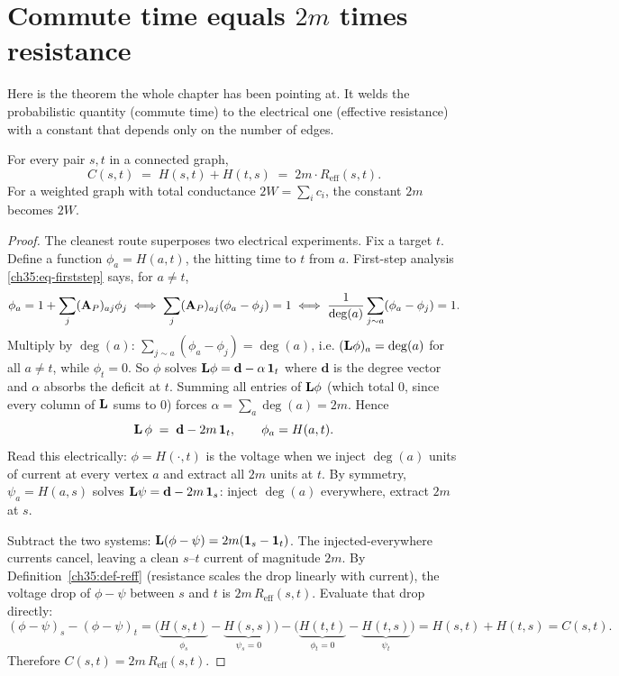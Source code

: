 \section{Commute time equals \texorpdfstring{$2m$}{2m} times resistance}\label{ch35:commute}

Here is the theorem the whole chapter has been pointing at. It welds the probabilistic quantity (commute time) to the electrical one (effective resistance) with a constant that depends only on the number of edges.

\begin{theorem}\label{ch35:thm-commute}
For every pair $s,t$ in a connected graph,
\[
  C(s,t)\;=\;H(s,t)+H(t,s)\;=\;2m\cdot R_{\mathrm{eff}}(s,t).
\]
For a weighted graph with total conductance $2W=\sum_{i}c_i$, the constant $2m$ becomes $2W$.
\end{theorem}

\begin{proof}
The cleanest route superposes two electrical experiments. Fix a target $t$. Define a function $\phi_a=H(a,t)$, the hitting time to $t$ from $a$. First-step analysis \eqref{ch35:eq-firststep} says, for $a\ne t$,
\[
  \phi_a=1+\sum_j (\mathbf{A}_P)_{aj}\phi_j
  \;\Longleftrightarrow\;
  \sum_j (\mathbf{A}_P)_{aj}(\phi_a-\phi_j)=1
  \;\Longleftrightarrow\;
  \frac{1}{\deg(a)}\sum_{j\sim a}(\phi_a-\phi_j)=1.
\]
Multiply by $\deg(a)$: $\sum_{j\sim a}(\phi_a-\phi_j)=\deg(a)$, i.e. $(\mathbf{L}\phi)_a=\deg(a)$ for all $a\ne t$, while $\phi_t=0$. So $\phi$ solves $\mathbf{L}\phi=\mathbf{d}-\alpha\,\mathbf{1}_t$ where $\mathbf{d}$ is the degree vector and $\alpha$ absorbs the deficit at $t$. Summing all entries of $\mathbf{L}\phi$ (which total $0$, since every column of $\mathbf{L}$ sums to $0$) forces $\alpha=\sum_a\deg(a)=2m$. Hence
\[
  \mathbf{L}\,\phi \;=\; \mathbf{d}-2m\,\mathbf{1}_t,
  \qquad \phi_a=H(a,t).
\]
Read this electrically: $\phi=H(\cdot,t)$ is the voltage when we inject $\deg(a)$ units of current at every vertex $a$ and extract all $2m$ units at $t$. By symmetry, $\psi_a=H(a,s)$ solves $\mathbf{L}\psi=\mathbf{d}-2m\,\mathbf{1}_s$: inject $\deg(a)$ everywhere, extract $2m$ at $s$.

Subtract the two systems: $\mathbf{L}(\phi-\psi)=2m(\mathbf{1}_s-\mathbf{1}_t)$. The injected-everywhere currents cancel, leaving a clean $s$--$t$ current of magnitude $2m$. By Definition~\ref{ch35:def-reff} (resistance scales the drop linearly with current), the voltage drop of $\phi-\psi$ between $s$ and $t$ is $2m\,R_{\mathrm{eff}}(s,t)$. Evaluate that drop directly:
\[
  (\phi-\psi)_s-(\phi-\psi)_t
  =\big(\underbrace{H(s,t)}_{\phi_s}-\underbrace{H(s,s)}_{\psi_s=0}\big)
   -\big(\underbrace{H(t,t)}_{\phi_t=0}-\underbrace{H(t,s)}_{\psi_t}\big)
  =H(s,t)+H(t,s)=C(s,t).
\]
Therefore $C(s,t)=2m\,R_{\mathrm{eff}}(s,t)$.
\end{proof}

